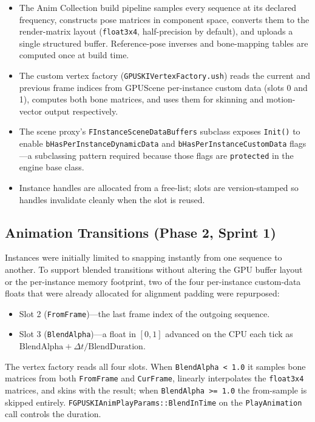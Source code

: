 \documentclass[11pt, a4paper]{article}
\begin{document}
\begin{itemize}[leftmargin=1.5em]
    \item The Anim Collection build pipeline samples every sequence at its declared frequency, constructs pose matrices in component space, converts them to the render-matrix layout (\texttt{float3x4}, half-precision by default), and uploads a single structured buffer. Reference-pose inverses and bone-mapping tables are computed once at build time.
    \item The custom vertex factory (\texttt{GPUSKIVertexFactory.ush}) reads the current and previous frame indices from GPUScene per-instance custom data (slots 0 and 1), computes both bone matrices, and uses them for skinning and motion-vector output respectively.
    \item The scene proxy's \texttt{FInstanceSceneDataBuffers} subclass exposes \texttt{Init()} to enable \texttt{bHasPer\-Instance\-Dynamic\-Data} and \texttt{bHasPer\-Instance\-Custom\-Data} flags---a subclassing pattern required because those flags are \texttt{protected} in the engine base class.
    \item Instance handles are allocated from a free-list; slots are version-stamped so handles invalidate cleanly when the slot is reused.
\end{itemize}

\subsection{Animation Transitions (Phase 2, Sprint 1)}

Instances were initially limited to snapping instantly from one sequence to another. To support blended transitions without altering the GPU buffer layout or the per-instance memory footprint, two of the four per-instance custom-data floats that were already allocated for alignment padding were repurposed:

\begin{itemize}[leftmargin=1.5em]
    \item Slot 2 (\texttt{FromFrame})---the last frame index of the outgoing sequence.
    \item Slot 3 (\texttt{BlendAlpha})---a float in $[0, 1]$ advanced on the CPU each tick as $\text{BlendAlpha} + \Delta t / \text{BlendDuration}$.
\end{itemize}

The vertex factory reads all four slots. When \texttt{BlendAlpha < 1.0} it samples bone matrices from both \texttt{FromFrame} and \texttt{CurFrame}, linearly interpolates the \texttt{float3x4} matrices, and skins with the result; when \texttt{BlendAlpha >= 1.0} the from-sample is skipped entirely. \texttt{FGPUSKIAnimPlayParams::BlendInTime} on the \texttt{PlayAnimation} call controls the duration.
\end{document}
